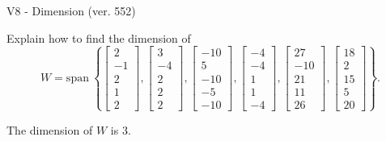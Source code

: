 \begin{exercise}
  \begin{exerciseTitle}V8 - Dimension (ver. 552)\end{exerciseTitle}
  \begin{exerciseStatement}
    Explain how to find the dimension of 
\[W=\mathrm{span}\ \left\{\left[\begin{array}{r}
2 \\
-1 \\
2 \\
1 \\
2
\end{array}\right] , \left[\begin{array}{r}
3 \\
-4 \\
2 \\
2 \\
2
\end{array}\right] , \left[\begin{array}{r}
-10 \\
5 \\
-10 \\
-5 \\
-10
\end{array}\right] , \left[\begin{array}{r}
-4 \\
-4 \\
1 \\
1 \\
-4
\end{array}\right] , \left[\begin{array}{r}
27 \\
-10 \\
21 \\
11 \\
26
\end{array}\right] , \left[\begin{array}{r}
18 \\
2 \\
15 \\
5 \\
20
\end{array}\right]\right\}.\]



  \end{exerciseStatement}
  \begin{exerciseAnswer}
   The dimension of \(W\) is  \(3\).
  


  \end{exerciseAnswer}
\end{exercise}